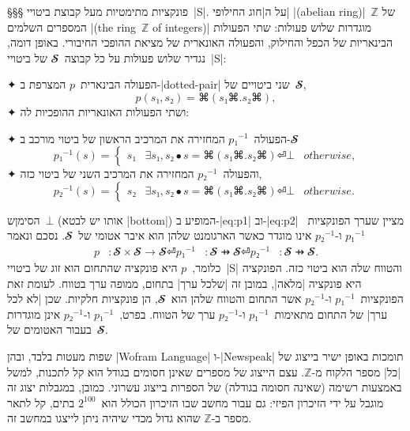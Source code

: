 §§§ פונקציות מתימטיות מעל קבוצת ביטויי~\E|S|.
על ה\ע|חוג החילופי| \E|(abelian ring)|~$ℤ$ של המספרים השלמים \E|(the ring~$ℤ$
of integers)| מוגדרות שלוש פעולות: שתי הפעולות הבינאריות של הכפל והחילוק,
והפעולה האונארית של מציאת ההופכי החיבורי. באופן דומה, נגדיר שלוש פעולות על כל
קבוצה~$𝓢$ של ביטויי~\E|S|:
\begin{enumerate}
  ✦ הפעולה הבינארית~$p$ המצרפת ב-\E|dotted-pair| שני ביטויים של~$𝓢$,
  \begin{equation}
    p(s₁,s₂)=⌘(s₁⌘.s₂⌘),
  \end{equation}
  ✦ ושתי הפעולות האונאריות ההופכיות לה:
  \begin{enumerate}
    ✦ הפעולה~$p₁^{-1}$ המחזירה את המרכיב
    הראשון של ביטוי מורכב ב-$𝓢$
    \begin{equation}\label{eq:p1}
      p₁^{-1}(s)=\begin{cases}
        s₁ & ∃ s₁, s₂ ∙ s=⌘(s₁⌘.s₂⌘) ⏎
        ⊥  & \textit{otherwise},
      \end{cases}
    \end{equation}
    ✦ והפעולה~$p₂^{-1}$ המחזירה את המרכיב השני של ביטוי כזה,
    \begin{equation}\label{eq:p2}
      p₂^{-1}(s)=\begin{cases}
        s₂ & ∃ s₁, s₂ ∙ s=⌘(s₁⌘.s₂⌘) ⏎
        ⊥  & \textit{otherwise}.
      \end{cases}
    \end{equation}
  \end{enumerate}
\end{enumerate}
הסימןש~$⊥$ (אותו יש לבטא \E|bottom|) המופיע ב-|eq:p1| וב-|eq:p2|
מציין שערך הפונקציות~$p₁^{-1}$ ו-$p₂^{-1}$ אינו מוגדר כאשר הארגומנט שלהן הוא
איבר אטומי של~$𝓢$. נסכם ונאמר
\begin{equation}
  \begin{split}
    p&:𝓢×𝓢→𝓢⏎
    p₁^{-1}&:𝓢 ⇸𝓢⏎
    p₂^{-1}&:𝓢 ⇸𝓢.
  \end{split}
\end{equation}
כלומר,~$p$ היא פונקציה שהתחום הוא זוג של ביטויי~\E|S| והטווח שלה הוא ביטוי כזה.
הפונקציה היא פונקציה \ע|מלאה|, במובן זה \ע|שלכל ערך| בתחום, ממופה ערך בטווח.
לעומת זאת הפונקציות~$p₁^{-1}$ ו-$p₂^{-1}$ אשר התחום והטווח שלהן הוא~$𝓢$, הן
פונקציות חלקיות. שכן \ע|לא לכל ערך| של התחום מתאימות~$p₁^{-1}$ ו-$p₂^{-1}$ ערך
של הטווח. בפרט,~$p₁^{-1}$ ו-$p₂^{-1}$ אינן מוגדרות בעבור האטומים של~$𝓢$.

שפות מעטות בלבד, ובהן \E|Wofram Language| ו-\E|Newspeak| תומכות באופן ישיר
בייצוג של \ע|כל| מספר הלקוח מ-$ℤ$. עצם הייצוג של מספרים שאינן חסומים בגודל
הוא קל לתכנות, למשל באמצעות רשימה (שאינה חסומה בגודלה) של הספרות בייצוג עשרוני.
כמובן, במגבלות יצוג זה מוגבל על ידי הזיכרון הפיזי: גם עבור מחשב שבו הזיכרון
הכולל הוא~$2^{100}$ בתים, קל לתאר מספר ב-$ℤ$ שהוא גדול מכדי שיהיה ניתן לייצגו
במחשב זה.

